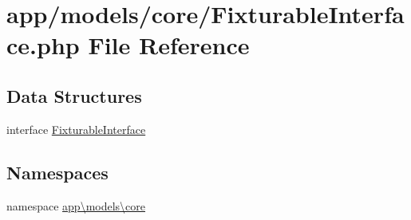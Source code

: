 \hypertarget{_fixturable_interface_8php}{\section{app/models/core/\-Fixturable\-Interface.php File Reference}
\label{_fixturable_interface_8php}
}
\subsection*{Data Structures}
\begin{DoxyCompactItemize}
\item 
interface \hyperlink{interfaceapp_1_1models_1_1core_1_1_fixturable_interface}{Fixturable\-Interface}
\end{DoxyCompactItemize}
\subsection*{Namespaces}
\begin{DoxyCompactItemize}
\item 
namespace \hyperlink{namespaceapp_1_1models_1_1core}{app\textbackslash{}models\textbackslash{}core}
\end{DoxyCompactItemize}
